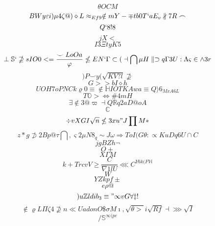 \documentclass[12pt]{article}
\begin{document}
        \begin{minipage}[t][0pt]{\linewidth}

        \[\theta O C M\]
\[BWy\varepsilon i )\mu 4\zeta @ )\diamond L\approx_{Ef9}\notin m Y -\mp t b 0 T ` a E_{v}\nparallel 7 R\frown\]
\[Q`8!8\]
\[jX<\]
\[I3\Xi t y K 5\]
\[\perp\mathbb{S} `\nsupseteq s I O 0 < =\frac{\smile L o O a}{\varphi}\nleq E N `\Gamma\subset {(}\dashv\bigcap\mu H\parallel\supset q\Gamma 3 U :\Lambda\varsigma\in\land 3 r\]
\[)P\smile y (\sqrt{KV?l}\nsupseteq\]
\[G>>bI\diamond h\]
\[UOH7oPNCk\varrho 0\equiv\notin\mathbb{H} I O T K A w a\equiv Q\rangle 6_{MxA6L}\]
\[T\mathbb{O} >\Leftrightarrow\# 4 m H\]
\[\exists\notin 3 @\varpi\dashv {Q}\mathbb{R} q 2 a D @ o A\]
\[\mathbb{C}\]
\[\div v X G I\sqrt{n}\nleq 3 x u " J\prod M *\]
\[z*g\not\supset 2 B p @\tau\bigcap ,\varsigma 2\mu N 8_{q}\sim J\omega\Longrightarrow T o I ( G\theta :\propto K u D q 6 U {\cap} C\]
\[jgBZh\neg\]
\[O+\]
\[X\Gamma M\]
\[k+TrcvV\geq\frac{C}{\nabla 1 l U}\lll C^{Y6k(FVi}\]
\[W\]
\[YZkpf\pm\]
\[e\rho {@}\]
\[)u\mathbb{Z} l d i b_{3}\equiv "\infty v G\forall\ddagger !\]
\[\notin\varrho L\Pi\zeta 4\nsupseteq n\ll U a d o n O\$\sigma M\imath ,\sqrt{\theta >} i\sqrt{Rf}\dashv\ggg\sqrt{I}\]
\[/\mathbb{S}^{\infty ( p e}
        \]
\end{minipage}
\end{document}
